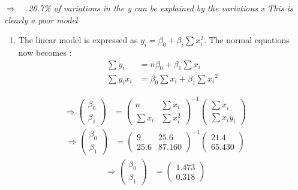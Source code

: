 \documentclass[
]{article}
\providecommand{\tightlist}{%
  \setlength{\itemsep}{0pt}\setlength{\parskip}{0pt}}
\begin{document}
\(\Rightarrow \quad\) \emph{20.7\% of variations in the y can be
explained by the variations x} \emph{This is clearly a poor model}

\begin{enumerate}
\def\labelenumi{\alph{enumi}.}
\setcounter{enumi}{1}
\tightlist
\item
  The linear model is expressed as
  \(y_i = \beta_0 + \beta_i \sum x_i^2\). The normal equations now
  becomes \(\colon\) \begin{align*}
  \sum y_i & = n\beta_0 + \beta_1 \sum x_i  \\
  \sum y_ix_i & = \beta_0 \sum x_i  + \beta_1 \sum x_i{^2}
    \end{align*}
\end{enumerate}

\begin{align*}
    \Rightarrow
    \begin{pmatrix}
      \beta_0\\
      \beta_1
    \end{pmatrix}
    & =
    \begin{pmatrix}
      n & \sum x_i\\
      \sum x_i & \sum x_i^2
    \end{pmatrix}^{-1}
    \begin{pmatrix}
      \sum x_i  \\
      \sum x_iy_i
    \end{pmatrix}
    \end{align*} \begin{align*}
      \Rightarrow
      \begin{pmatrix}
        \beta_0\\
        \beta_1
    \end{pmatrix}
    & =
    \begin{pmatrix}
    9 & 25.6\\
    25.6 & 87.160
    \end{pmatrix}^{-1}
    \begin{pmatrix}
    21.4 \\
    65.430
    \end{pmatrix}
    \end{align*} \begin{align*}
      \Rightarrow
      \begin{pmatrix}
        \beta_0\\
        \beta_1
    \end{pmatrix}
    & =
    \begin{pmatrix}
      1.473 \\
      0.318
    \end{pmatrix}
    \end{align*}
\end{document}

